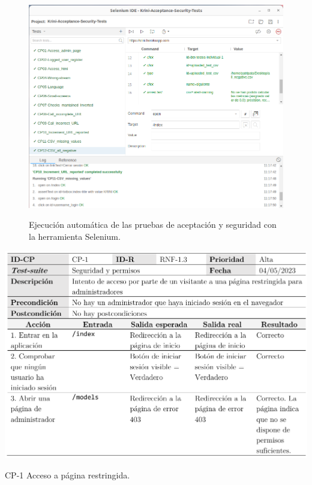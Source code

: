 \begin{figure}[h]
	\caption[Selenium: ejecución automática de pruebas de aceptación]{Ejecución automática de las pruebas de aceptación y seguridad con la herramienta Selenium.}
	\centering
	\includegraphics[width=\textwidth]{../img/anexos/cp/selenium-tests}
	\label{cp:selenium}
\end{figure}

\begin{table}[p]
	\centering
	\includegraphics[width=\textwidth]{../img/anexos/cp/CP-1}
	\caption{CP-1 Acceso a página restringida.}
	\label{cp:acc-restringido}
\end{table}

